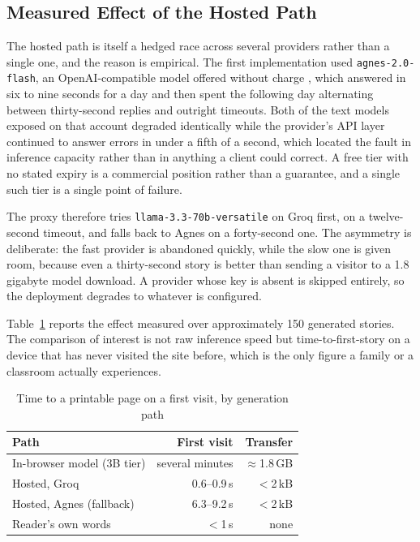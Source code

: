 \documentclass[conference]{IEEEtran}
\begin{document}
\subsection{Measured Effect of the Hosted Path}

The hosted path is itself a hedged race across several providers rather than a single one, and the reason is empirical. The first implementation used \texttt{agnes-2.0-flash}, an OpenAI-compatible model offered without charge \cite{agnes}, which answered in six to nine seconds for a day and then spent the following day alternating between thirty-second replies and outright timeouts. Both of the text models exposed on that account degraded identically while the provider's API layer continued to answer errors in under a fifth of a second, which located the fault in inference capacity rather than in anything a client could correct. A free tier with no stated expiry is a commercial position rather than a guarantee, and a single such tier is a single point of failure.

The proxy therefore tries \texttt{llama-3.3-70b-versatile} on Groq first, on a twelve-second timeout, and falls back to Agnes on a forty-second one. The asymmetry is deliberate: the fast provider is abandoned quickly, while the slow one is given room, because even a thirty-second story is better than sending a visitor to a 1.8 gigabyte model download. A provider whose key is absent is skipped entirely, so the deployment degrades to whatever is configured.

Table~\ref{tab:hosted} reports the effect measured over approximately 150 generated stories. The comparison of interest is not raw inference speed but time-to-first-story on a device that has never visited the site before, which is the only figure a family or a classroom actually experiences.

\begin{table}[t]
\caption{Time to a printable page on a first visit, by generation path}
\label{tab:hosted}
\centering
\begin{tabular}{@{}lrr@{}}
\toprule
\textbf{Path} & \textbf{First visit} & \textbf{Transfer} \\
\midrule
In-browser model (3B tier) & several minutes & $\approx$1.8\,GB \\
Hosted, Groq & 0.6--0.9\,s & $<$2\,kB \\
Hosted, Agnes (fallback) & 6.3--9.2\,s & $<$2\,kB \\
Reader's own words & $<$1\,s & none \\
\bottomrule
\end{tabular}
\end{table}
\end{document}
